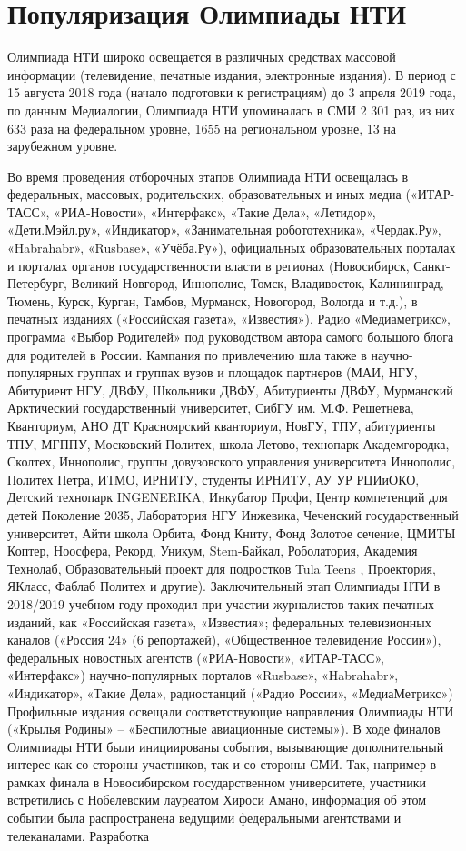 \section*{Популяризация Олимпиады НТИ}

Олимпиада НТИ широко освещается в различных средствах массовой информации (телевидение, печатные издания, электронные издания). В период с 15 августа 2018 года (начало подготовки к регистрациям) до 3 апреля 2019 года, по данным Медиалогии, Олимпиада НТИ упоминалась в СМИ 2 301 раз, из них 633 раза на федеральном уровне, 1655 на региональном уровне, 13 на зарубежном уровне. 

Во время проведения отборочных этапов Олимпиада НТИ освещалась в федеральных, массовых, родительских, образовательных и иных медиа («ИТАР-ТАСС», «РИА-Новости», «Интерфакс», «Такие Дела», «Летидор», «Дети.Мэйл.ру», «Индикатор», «Занимательная робототехника», «Чердак.Ру», «Habrahabr», «Rusbase», \linebreak «Учёба.Ру»), официальных образовательных порталах и порталах органов государственности власти в регионах  (Новосибирск, Санкт-Петербург, Великий Новгород, Иннополис, Томск, Владивосток, Калининград, Тюмень, Курск, Курган, Тамбов, Мурманск, Новогород, Вологда и т.д.), в печатных изданиях («Российская газета», «Известия»). Радио «Медиаметрикс», программа «Выбор Родителей» под руководством автора самого большого блога для родителей в России.  Кампания по привлечению шла также в научно-популярных группах и группах вузов и площадок партнеров (МАИ, НГУ, Абитуриент НГУ,  ДВФУ, Школьники ДВФУ, Абитуриенты ДВФУ, Мурманский Арктический государственный университет, СибГУ им. М.Ф. Решетнева, Кванториум, АНО ДТ Красноярский кванториум,  НовГУ, ТПУ, абитуриенты ТПУ, МГППУ, Московский Политех, школа Летово, технопарк Академгородка, Сколтех, Иннополис, группы довузовского управления университета Иннополис, Политех Петра, ИТМО, ИРНИТУ, студенты ИРНИТУ, АУ УР РЦИиОКО, Детский технопарк INGENERIKA, Инкубатор Профи, Центр компетенций для детей Поколение 2035, Лаборатория НГУ Инжевика, Чеченский государственный университет, Айти школа Орбита, Фонд Книту, Фонд Золотое сечение, ЦМИТЫ Коптер, Ноосфера, Рекорд, Уникум, Stem-Байкал, Роболатория, Академия Технолаб, Образовательный проект для подростков Tula Teens ,  Проектория, ЯКласс, Фаблаб Политех и другие).  Заключительный этап Олимпиады НТИ в 2018/2019 учебном году проходил при участии журналистов таких печатных изданий, как «Российская газета», «Известия»; федеральных телевизионных каналов («Россия 24» (6 репортажей), «Общественное телевидение России»), федеральных новостных агентств («РИА-Новости», «ИТАР-ТАСС», «Интерфакс») научно-популярных порталов  «Rusbase», «Habrahabr», «Индикатор», «Такие Дела», радиостанций («Радио России», «МедиаМетрикс») Профильные издания освещали соответствующие направления Олимпиады НТИ («Крылья Родины» – «Беспилотные авиационные системы»). В ходе финалов Олимпиады НТИ были инициированы события, вызывающие дополнительный интерес как со стороны участников, так и со стороны СМИ. Так, например в рамках финала в Новосибирском государственном университете, участники встретились с Нобелевским лауреатом Хироси Амано, информация об этом событии была распространена ведущими федеральными агентствами и телеканалами. Разработка 
